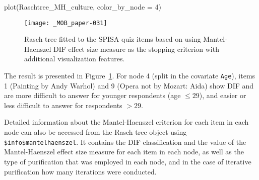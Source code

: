 \documentclass[doc,floatsintext,natbib]{apa7}
\begin{document}



\begin{Schunk}
\begin{Sinput}
 plot(Raschtree_MH_culture, color_by_node = 4)
\end{Sinput}
\end{Schunk}


\begin{figure}%
\caption{Rasch tree fitted to the SPISA quiz items based on using Mantel-Haenszel DIF effect size measure as the stopping criterion with additional visualization features.}
\texttt{[image: \_MOB\_paper-031]}
\label{fig:MHtree4}
\end{figure}%

The result is presented in Figure~\ref{fig:MHtree4}. For node 4 (split in the covariate \texttt{Age}), items 1 (Painting by Andy Warhol) and 9 (Opera not by Mozart: Aida) show DIF and are %
more difficult to answer for younger respondents (age $\leq 29$), and easier or less difficult to answer for respondents $>29$.

Detailed information about the Mantel-Haenszel criterion for each item in each node can also be accessed from the Rasch tree object using \texttt{\$info\$mantelhaenszel}. It contains the DIF classification and the value of the Mantel-Haenszel effect size measure for each item in each node, as well as the type of purification that was employed in each node, and in the case of iterative purification how many iterations were conducted.
\end{document}
